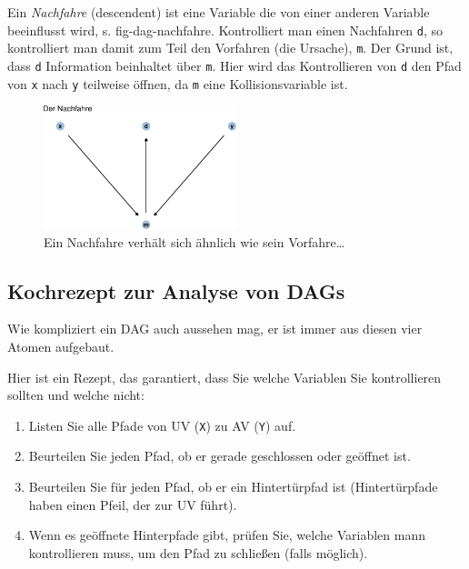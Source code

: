 \documentclass[
  a4paper,
  DIV=11]{scrreprt}
\providecommand{\tightlist}{%
  \setlength{\itemsep}{0pt}\setlength{\parskip}{0pt}}\usepackage{longtable,booktabs,array}
\theoremstyle{definition}
\theoremstyle{remark}
\begin{document}
Ein \emph{Nachfahre} (descendent) ist eine Variable die von einer
anderen Variable beeinflusst wird, s. fig-dag-nachfahre. Kontrolliert
man einen Nachfahren \texttt{d}, so kontrolliert man damit zum Teil den
Vorfahren (die Ursache), \texttt{m}. Der Grund ist, dass \texttt{d}
Information beinhaltet über \texttt{m}. Hier wird das Kontrollieren von
\texttt{d} den Pfad von \texttt{x} nach \texttt{y} teilweise öffnen, da
\texttt{m} eine Kollisionsvariable ist.

\begin{figure}

{\centering \includegraphics[width=0.5\textwidth,height=\textheight]{./kausal_files/figure-pdf/fig-dag-nachfahre-1.pdf}

}

\caption{\label{fig-dag-nachfahre}Ein Nachfahre verhält sich ähnlich wie
sein Vorfahre\ldots{}}

\end{figure}

\hypertarget{kochrezept-zur-analyse-von-dags}{%
\subsection{Kochrezept zur Analyse von
DAGs}\label{kochrezept-zur-analyse-von-dags}}

Wie kompliziert ein DAG auch aussehen mag, er ist immer aus diesen vier
Atomen aufgebaut.

Hier ist ein Rezept, das garantiert, dass Sie welche Variablen Sie
kontrollieren sollten und welche nicht:

\begin{enumerate}
\def\labelenumi{\arabic{enumi}.}
\tightlist
\item
  Listen Sie alle Pfade von UV (\texttt{X}) zu AV (\texttt{Y}) auf.
\item
  Beurteilen Sie jeden Pfad, ob er gerade geschlossen oder geöffnet ist.
\item
  Beurteilen Sie für jeden Pfad, ob er ein Hintertürpfad ist
  (Hintertürpfade haben einen Pfeil, der zur UV führt).
\item
  Wenn es geöffnete Hinterpfade gibt, prüfen Sie, welche Variablen mann
  kontrollieren muss, um den Pfad zu schließen (falls möglich).
\end{enumerate}
\end{document}
